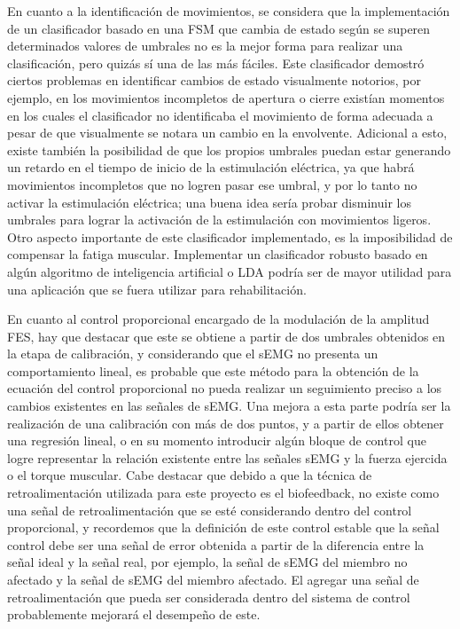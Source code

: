 
En cuanto a la identificación de movimientos, se considera que la implementación de un clasificador basado en una FSM que cambia de estado según se superen determinados valores de umbrales no es la mejor forma para realizar una clasificación, pero quizás sí una de las más fáciles. Este clasificador demostró ciertos problemas en identificar cambios de estado visualmente notorios, por ejemplo, en los movimientos incompletos de apertura o cierre existían momentos en los cuales el clasificador no identificaba el movimiento de forma adecuada a pesar de que visualmente se notara un cambio en la envolvente. Adicional a esto, existe también la posibilidad de que los propios umbrales puedan estar generando un retardo en el tiempo de inicio de la estimulación eléctrica, ya que habrá movimientos incompletos que no logren pasar ese umbral, y por lo tanto no activar la estimulación eléctrica; una buena idea sería probar disminuir los umbrales para lograr la activación de la estimulación con movimientos ligeros. Otro aspecto importante de este clasificador implementado, es la imposibilidad de compensar la fatiga muscular. Implementar un clasificador robusto basado en algún algoritmo de inteligencia artificial o LDA podría ser de mayor utilidad para una aplicación que se fuera utilizar para rehabilitación.

En cuanto al control proporcional encargado de la modulación de la amplitud FES, hay que destacar que este se obtiene a partir de dos umbrales obtenidos en la etapa de calibración, y considerando que el sEMG no presenta un comportamiento lineal, es probable que este método para la obtención de la ecuación del control proporcional no pueda realizar un seguimiento preciso a los cambios existentes en las señales de sEMG. Una mejora a esta parte podría ser la realización de una calibración con más de dos puntos, y a partir de ellos obtener una regresión lineal, o en su momento introducir algún bloque de control que logre representar la relación existente entre las señales sEMG y la fuerza ejercida o el torque muscular. Cabe destacar que debido a que la técnica de retroalimentación utilizada para este proyecto es el biofeedback, no existe como una señal de retroalimentación que se esté considerando dentro del control proporcional, y recordemos que la definición de este control estable que la señal control debe ser una señal de error obtenida a partir de la diferencia entre la señal ideal y la señal real, por ejemplo, la señal de sEMG del miembro no afectado y la señal de sEMG del miembro afectado. El agregar una señal de retroalimentación que pueda ser considerada dentro del sistema de control probablemente mejorará el desempeño de este.

